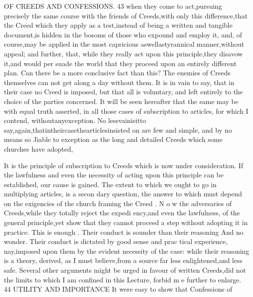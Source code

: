 \documentclass[
]{book}
\begin{document}
OF CREEDS AND CONFESSIONS. 43
when they come to act,pursuing precisely the same course with the friends of Creeds,with
only this difference,that the Creed which they apply as a test,instead of being a written and tangible document,is hidden in the bosoms of
those who expound and employ it, and, of
course,may be applied in the most capricious
aswellastyrannical manner,without appeal;
and further, that, while they really act upon
this principle,they disavow it,and would per suade the world that they proceed upon an
entirely different plan.
Can there be a more conclusive fact than
this? The enemies of Creeds themselves can
not get along a day without them. It is in
vain to say, that in their case no Creed is
imposed, but that all is voluntary, and left
entirely to the choice of the parties concerned. It will be seen hereafter that the same may be
with equal truth asserted, in all those cases of subscription to articles, for which I contend,
withoutanyexception. No lessvainisitto say,again,thatintheircasethearticlesinsisted on are few and simple, and by no means so
Jiable to exception as the long and detailed Creeds which some churches have adopted,

It is the principle of subscription to Creeds which is now under consideration. If the
lawfulness and even the necessity of acting upon this principle can be established, our cause is gained. The extent to which we ought to go in multiplying articles, is a secon dary question, the answer to which must depend on the exigencies of the church framing the Creed . N o w the adversaries of
Creeds,while they totally reject the expedi ency,and even the lawfulness, of the general
principle,yet show that they cannot proceed a step without adopting it in practice. This
is enough . Their conduct is sounder than their reasoning And no wonder. Their
conduct is dictated by good sense and prac
tical experience, nay,imposed upon them by
the evident necessity of the case: while their
reasoning is a theory, derived, as I must
believe,from a source far less enlightened,and less safe.
Several other arguments might be urged in favour of written Creeds,did not the limits to
which I am confined in this Lecture, forbid m e further to enlarge.
44
UTILITY AND IMPORTANCE
It were easy to show that Confessions of
\end{document}
